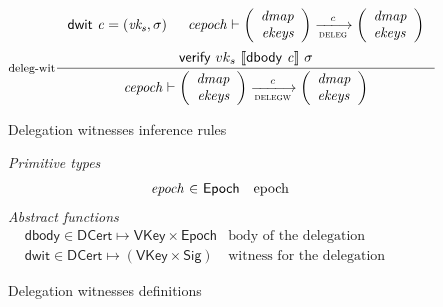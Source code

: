 \documentclass[11pt,a4paper]{article}
\newcommand{\var}[1]{\mathit{#1}}
\newcommand{\fun}[1]{\mathsf{#1}}
\newcommand{\type}[1]{\mathsf{#1}}
\newcommand{\trans}[2]{\xlongrightarrow[\textsc{#1}]{#2}}
\newcommand{\VKey}{\type{VKey}}
\newcommand{\Sig}{\type{Sig}}
\newcommand{\DCert}{\type{DCert}}
\newcommand{\Epoch}{\type{Epoch}}
\newcommand{\verify}[3]{\fun{verify} ~ #1 ~ #2 ~ #3}
\newcommand{\serialised}[1]{\llbracket \var{#1} \rrbracket}
\newcommand{\dbody}[1]{\fun{dbody}~\var{#1}}
\newcommand{\dwit}[1]{\fun{dwit}~\var{#1}}
\begin{document}
\begin{figure}
  \begin{equation}
    \label{eq:deleg-witnesses}
    \inference[deleg-wit]
    { \dwit{c} = (\var{vk_s}, \sigma)
      & \var{cepoch} \vdash
      {\left(
        \begin{array}{r}
          \var{dmap}\\
          \var{ekeys}
        \end{array}
      \right)}
      \trans{deleg}{c}
      {\left(
      \begin{array}{l}
          \var{dmap}\\
          \var{ekeys}
      \end{array}
      \right)}
      \\ ~ \\
      \verify{vk_s}{\serialised{\dbody{c}}}{\sigma}
    }
    {\var{cepoch} \vdash
      {\left(
        \begin{array}{r}
          \var{dmap}\\
          \var{ekeys}
        \end{array}
      \right)}
      \trans{delegw}{c}
      {\left(
      \begin{array}{l}
          \var{dmap}\\
          \var{ekeys}
      \end{array}
      \right)}}
  \end{equation}
  \caption{Delegation witnesses inference rules}
  \label{fig:deleg-witnesses}
\end{figure}

\begin{figure}
  \emph{Primitive types}
  \begin{equation*}
    \begin{array}{r@{~\in~}lr}
      \var{epoch} & \Epoch & \text{epoch}
    \end{array}
  \end{equation*}
    \emph{Abstract functions}
  \begin{align*}
      & \fun{dbody} \in \DCert \mapsto \VKey \times \Epoch & \text{body of the delegation certificate}\\
      & \fun{dwit} \in \DCert \mapsto (\VKey \times \Sig) & \text{witness for the delegation certificate}
  \end{align*}
  \caption{Delegation witnesses definitions}
  \label{fig:delegation-witnesses-defs}
\end{figure}
\end{document}
